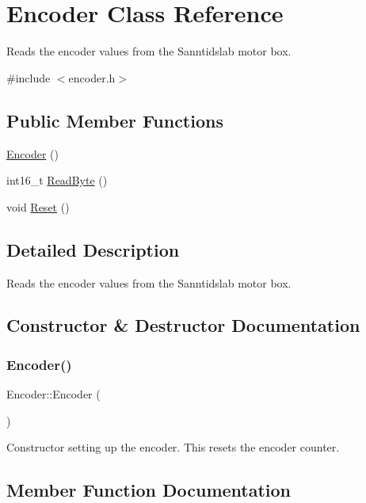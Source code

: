 \hypertarget{class_encoder}{}\section{Encoder Class Reference}
\label{class_encoder}


Reads the encoder values from the Sanntidslab motor box.  




{\ttfamily \#include $<$encoder.\+h$>$}

\subsection*{Public Member Functions}
\begin{DoxyCompactItemize}
\item 
\hyperlink{class_encoder_ab5d9324930644abeb150da7a7747ffe3}{Encoder} ()
\item 
int16\+\_\+t \hyperlink{class_encoder_a197bd59521ad491bb5c0a9e6d473433c}{Read\+Byte} ()
\item 
void \hyperlink{class_encoder_a4375bf4d88d56f5f5d09860f9062d691}{Reset} ()
\end{DoxyCompactItemize}


\subsection{Detailed Description}
Reads the encoder values from the Sanntidslab motor box. 

\subsection{Constructor \& Destructor Documentation}
\hypertarget{class_encoder_ab5d9324930644abeb150da7a7747ffe3}{}\label{class_encoder_ab5d9324930644abeb150da7a7747ffe3} 
\subsubsection{\texorpdfstring{Encoder()}{Encoder()}}
{\footnotesize\ttfamily Encoder\+::\+Encoder (\begin{DoxyParamCaption}{ }\end{DoxyParamCaption})}

Constructor setting up the encoder. This resets the encoder counter. 

\subsection{Member Function Documentation}
\hypertarget{class_encoder_a197bd59521ad491bb5c0a9e6d473433c}{}\label{class_encoder_a197bd59521ad491bb5c0a9e6d473433c} 
